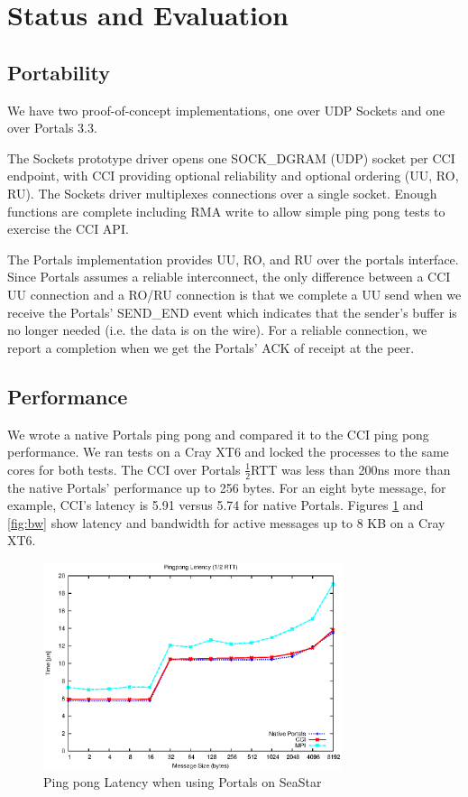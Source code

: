 \section{Status and Evaluation}
\label{sec:evaluation}

\subsection{Portability}
We have two proof-of-concept implementations, one over UDP Sockets and
one over Portals 3.3.

The Sockets prototype driver opens one SOCK\_DGRAM (UDP) socket per
CCI endpoint, with CCI  providing optional reliability and optional
ordering (UU, RO, RU). 
The Sockets driver multiplexes connections over a single socket.
Enough functions are complete including RMA write to allow simple ping pong
tests to exercise the CCI API.

The Portals implementation provides UU, RO, and RU over the portals
interface. Since Portals assumes a reliable interconnect, the
only difference between a CCI UU connection and a RO/RU connection is that we
complete a UU send when we receive the Portals' SEND\_END event which indicates
that the sender's buffer is no longer needed (i.e. the data is on the wire).
For a reliable connection, we report a completion when we get the Portals' ACK
of receipt at the peer.

\subsection{Performance}
We wrote a native Portals ping pong and compared it to the CCI ping pong
performance. We ran tests on a Cray XT6 and locked the processes to the same
cores for both tests. The CCI over Portals \begin{math}\frac{1}{2}\end{math}RTT
was less than 200ns more than the native Portals' performance up to 256 bytes.
For an eight byte message, for example, CCI's latency is 5.91 \us versus 5.74
\us for native Portals. Figures \ref{fig:latency} and \ref{fig:bw} show latency
and bandwidth for active messages up to 8 KB on a Cray XT6.

\begin{figure}[htbp]
\centering
\includegraphics[width=3.45in]{pingpong-latency.eps}
\caption{Ping pong Latency when using Portals on SeaStar}
\label{fig:latency}
\end{figure}


